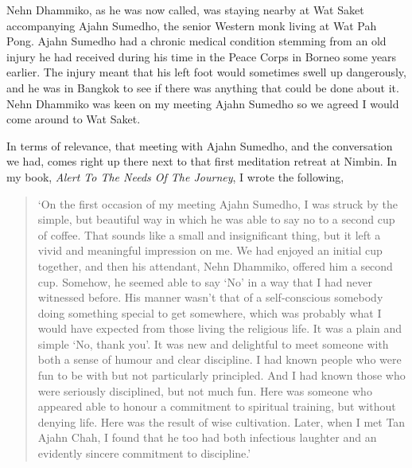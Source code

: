 Nehn Dhammiko, as he was
now called, was staying nearby at Wat Saket accompanying Ajahn Sumedho,
the senior Western monk living at Wat Pah Pong. Ajahn Sumedho had a
chronic medical condition stemming from an old injury he had received
during his time in the Peace Corps in Borneo some years earlier. The
injury meant that his left foot would sometimes swell up dangerously,
and he was in Bangkok to see if there was anything that could be done
about it. Nehn Dhammiko was keen on my meeting Ajahn Sumedho so we
agreed I would come around to Wat Saket.

In terms of relevance, that meeting with Ajahn Sumedho, and the
conversation we had, comes right up there next to that first meditation
retreat at Nimbin. In my book, \emph{Alert To The Needs Of The Journey}\cite{alert},
I wrote the following,

\begin{quotation}
`On the first occasion of my meeting Ajahn Sumedho, I was struck by the
simple, but beautiful way in which he was able to say no to a second cup
of coffee. That sounds like a small and insignificant thing, but it left
a vivid and meaningful impression on me. We had enjoyed an initial cup
together, and then his attendant, Nehn Dhammiko, offered him a second
cup. Somehow, he seemed able to say `No' in a way that I had never
witnessed before. His manner wasn't that of a self-conscious somebody
doing something special to get somewhere, which was probably what I
would have expected from those living the religious life. It was a plain
and simple `No, thank you'. It was new and delightful to meet someone
with both a sense of humour and clear discipline. I had known people who
were fun to be with but not particularly principled. And I had known
those who were seriously disciplined, but not much fun. Here was someone
who appeared able to honour a commitment to spiritual training, but
without denying life. Here was the result of wise cultivation. Later,
when I met Tan Ajahn Chah, I found that he too had both infectious
laughter and an evidently sincere commitment to discipline.'
\end{quotation}

